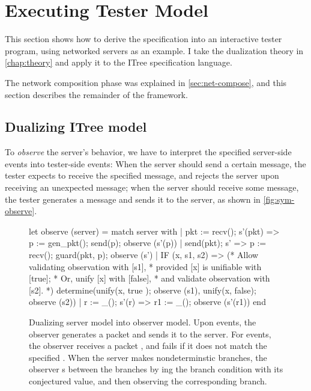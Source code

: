 \section{Executing Tester Model}
\label{sec:backtrack}

This section shows how to derive the specification into an interactive tester
program, using networked servers as an example.  I take the dualization theory
in \autoref{chap:theory} and apply it to the ITree specification language.

  The network composition phase was
explained in \autoref{sec:net-compose}, and this section describes the remainder
of the framework.

\subsection{Dualizing ITree model}
\label{sec:symbolic-observer}
To {\em observe} the server's behavior, we have to interpret the specified
server-side events into tester-side events: When the server should send a
certain message, the tester expects to receive the specified message, and
rejects the server upon receiving an unexpected message; when the server should
receive some message, the tester generates a message and sends it to the server,
as shown in \autoref{fig:sym-observe}.

\begin{figure}
  \begin{coq}
let observe (server) =
  match server with
  | pkt := recv(); s'(pkt) =>
    p := gen_pkt(); send(p); observe (s'(p))
  | send(pkt); s' =>
    p := recv(); guard(pkt, p); observe (s')
  | IF (x, s1, s2) =>
    (* Allow validating observation with [s1],
     * provided [x] is unifiable with [true];
     * Or, unify [x] with [false],
     * and validate observation with [s2]. *)
    determine(unify(x, true ); observe (s1),
              unify(x, false); observe (s2))
  | r  := _(); s'(r) =>
    r1 := _(); observe (s'(r1))
  end
  \end{coq}
  \caption{Dualizing server model into observer model.  Upon  events,
    the observer generates a packet and sends it to the server.  For 
    events, the observer receives a packet , and fails if it does not
    match the specified .  When the server makes nondeterminstic
     branches, the observer s between the branches by
    ing the branch condition with its conjectured value, and then
    observing the corresponding branch.
  }
  \label{fig:sym-observe}
\end{figure}

